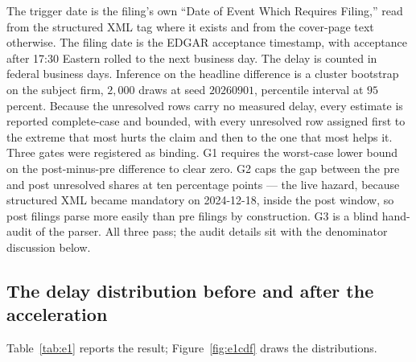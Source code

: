 \documentclass[11pt]{article}
\begin{document}
The trigger date is the filing's own ``Date of Event Which Requires Filing,'' read from the
structured XML tag where it exists and from the cover-page text otherwise. The filing date is
the EDGAR acceptance timestamp, with acceptance after 17:30 Eastern rolled to the next business
day. The delay is counted in federal business days. Inference on the headline difference is a
cluster bootstrap on the subject firm, $2{,}000$ draws at seed $20260901$, percentile interval
at $95$ percent. Because the unresolved rows carry no measured delay, every estimate is reported
complete-case and bounded, with every unresolved row assigned first to the extreme that most
hurts the claim and then to the one that most helps it. Three gates were registered as binding.
G1 requires the worst-case lower bound on the post-minus-pre difference to clear zero. G2 caps
the gap between the pre and post unresolved shares at ten percentage points --- the live hazard,
because structured XML became mandatory on 2024-12-18, inside the post window, so post filings
parse more easily than pre filings by construction. G3 is a blind hand-audit of the parser. All
three pass; the audit details sit with the denominator discussion below.

\subsection{The delay distribution before and after the acceleration}
\label{sec:e1result}

Table~\ref{tab:e1} reports the result; Figure~\ref{fig:e1cdf} draws the distributions.
\end{document}
